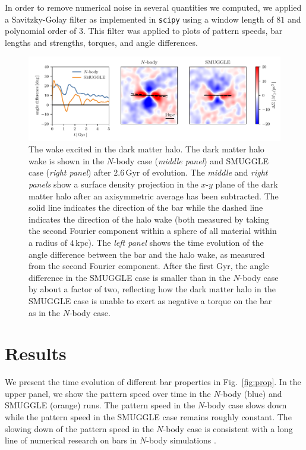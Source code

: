 \documentclass[fleqn,usenatbib]{mnras}
\newcommand{\Nbody}{$N$-body}
\begin{document}
In order to remove numerical noise in several quantities we computed, we
applied a Savitzky-Golay filter \citep{1964AnaCh..36.1627S} as implemented in
\texttt{scipy} using a window length of $81$ and polynomial order of $3$. This
filter was applied to plots of pattern speeds, bar lengths and strengths,
torques, and angle differences.

\begin{figure}
    \centering
    \includegraphics[width=\textwidth]{fig/halo_wake.pdf}
    \caption{The wake excited in the dark matter halo. The dark matter halo wake
    is shown in the \Nbody{} case (\textit{middle panel}) and SMUGGLE case
    (\textit{right panel}) after $2.6\,\textrm{Gyr}$ of evolution. The
    \textit{middle} and \textit{right panels} show a surface density projection
    in the $x$-$y$ plane of the dark matter halo after an axisymmetric average
    has been subtracted. The solid line indicates the direction of the bar while
    the dashed line indicates the direction of the halo wake (both measured by
    taking the second Fourier component within a sphere of all material within a
    radius of $4\,\textrm{kpc}$). The \textit{left panel} shows the time
    evolution of the angle difference between the bar and the halo wake, as
    measured from the second Fourier component. After the first Gyr, the angle
    difference in the SMUGGLE case is smaller than in the \Nbody{} case by about
    a factor of two, reflecting how the dark matter halo in the SMUGGLE case is
    unable to exert as negative a torque on the bar as in the \Nbody{} case.}
    \label{fig:wake}
\end{figure}

\section{Results}
\label{sec:results}

We present the time evolution of different bar properties in Fig.~\ref{fig:prop}.
In the upper panel, we show the pattern speed over time in the \Nbody{} (blue)
and SMUGGLE (orange) runs. The pattern speed in the \Nbody{} case slows down
while the pattern speed in the SMUGGLE case remains roughly constant. The
slowing down of the pattern speed in the \Nbody{} case is consistent with a long
line of numerical research on bars in \Nbody{} simulations
\citep{1992ApJ...400...80H, 2000ApJ...543..704D, 2002MNRAS.330...35A,
2002ApJ...569L..83A, 2003MNRAS.341.1179A, 2003MNRAS.346..251O,
2005MNRAS.363..991H, 2006ApJ...637..214M, 2007MNRAS.375..460W,
2009ApJ...697..293D}.
\end{document}
